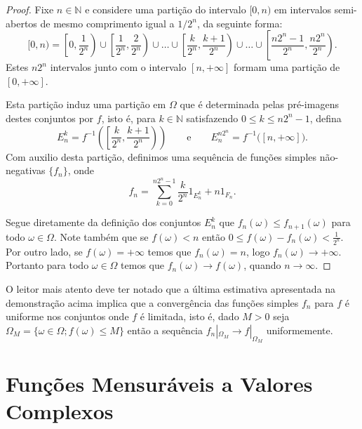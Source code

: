 \begin{proof} 
Fixe $n\in\mathbb{N}$ e considere uma partição do 
intervalo $[0,n)$ em intervalos semi-abertos de
mesmo comprimento igual a $1/2^n$, da seguinte 
forma:
\[
[0,n)
=
\left[ 0,\frac{1}{2^n} \right) 
\cup
\left[ \frac{1}{2^n},\frac{2}{2^n} \right) 
\cup
\ldots
\cup 
\left[ \frac{k}{2^n},\frac{k+1}{2^n} \right) 
\cup
\ldots
\cup
\left[ \frac{n2^n-1}{2^n}, \frac{n2^n}{2^n} \right).
\]
Estes $n2^n$ intervalos 
junto com o intervalo $[n,+\infty]$ formam uma partição 
de $[0,+\infty]$. 

Esta partição induz uma partição em $\Omega$
que é determinada pelas pré-imagens destes conjuntos 
por $f$, isto é, para $k\in\mathbb{N}$ satisfazendo 
$0\leq k\leq n2^{n}-1$, defina
\[
E_{n}^{k}=
f^{-1}\left( \left[\frac{k}{2^n},\frac{k+1}{2^n} \right) \right)
\qquad \text{e} \qquad
E_n^{n2^n}=f^{-1}\big( [n,+\infty]\big).
\]
Com auxilio desta partição, 
definimos uma sequência de funções simples
não-negativas $\{f_n\}$, onde 
\[
f_n =\sum_{k=0}^{n2^n-1} \frac{k}{2^n} 1_{E_{n}^{k}} + n 1_{F_n}.
\]

Segue diretamente da definição dos conjuntos 
$E_{n}^{k}$ que $f_n(\omega)\leq f_{n+1}(\omega)$ 
para todo $\omega\in\Omega$.
Note também que se $f(\omega)<n$ 
então $0\leq f(\omega)-f_n(\omega)<\frac{1}{2^n}$. 
Por outro lado, se 
$f(\omega)=+\infty$ temos que $f_n(\omega)= n$,
logo $f_n(\omega)\to+\infty$.
Portanto para todo $\omega\in\Omega$ temos que 
$f_n(\omega)\to f(\omega)$, quando $n\to\infty$.
\end{proof}

\begin{observacao} 
O leitor mais atento deve ter notado que 
a última estimativa apresentada na demonstração acima 
implica que a convergência das funções simples $f_n$ 
para $f$ é uniforme nos conjuntos 
onde $f$ é limitada, isto é, dado $M>0$ 
seja $\Omega_M=\{\omega\in\Omega; f(\omega)\leq M\}$ então a sequência 
$f_n|_{\Omega_M}\to f|_{\Omega_M}$ uniformemente.
\end{observacao}

 







\section{Funções Mensuráveis a Valores Complexos}


